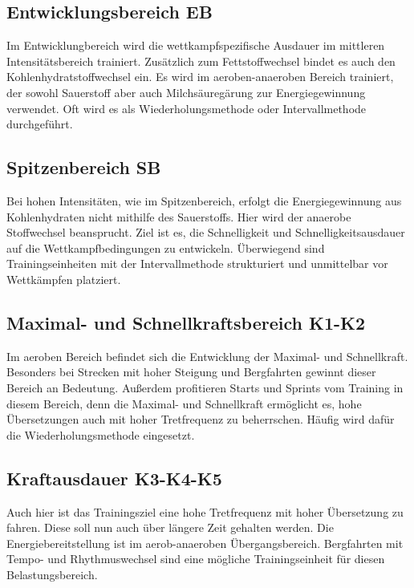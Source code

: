 \subsection{Entwicklungsbereich EB}
Im Entwicklungbereich wird die wettkampfspezifische Ausdauer im mittleren Intensitätsbereich trainiert. Zusätzlich zum Fettstoffwechsel bindet es auch den Kohlenhydratstoffwechsel ein. Es wird im aeroben-anaeroben Bereich trainiert, der sowohl Sauerstoff aber auch Milchsäuregärung zur Energiegewinnung verwendet. Oft wird es als Wiederholungsmethode oder Intervallmethode durchgeführt.
\subsection{Spitzenbereich SB}
Bei hohen Intensitäten, wie im Spitzenbereich, erfolgt die Energiegewinnung aus Kohlenhydraten nicht mithilfe des Sauerstoffs. Hier wird der anaerobe Stoffwechsel beansprucht.
Ziel ist es, die Schnelligkeit und Schnelligkeitsausdauer auf die Wettkampfbedingungen zu entwickeln. Überwiegend sind Trainingseinheiten mit der Intervallmethode strukturiert und unmittelbar vor Wettkämpfen platziert.
\subsection{Maximal- und Schnellkraftsbereich K1-K2}
Im aeroben Bereich befindet sich die Entwicklung der Maximal- und Schnellkraft. Besonders bei Strecken mit hoher Steigung und Bergfahrten gewinnt dieser Bereich an Bedeutung. Außerdem profitieren Starts und Sprints vom Training in diesem Bereich, denn die Maximal- und Schnellkraft ermöglicht es, hohe Übersetzungen auch mit hoher Tretfrequenz zu beherrschen. Häufig wird dafür die Wiederholungsmethode eingesetzt. 
\subsection{Kraftausdauer K3-K4-K5}
Auch hier ist das Trainingsziel eine hohe Tretfrequenz mit hoher Übersetzung zu fahren. Diese soll nun auch über längere Zeit gehalten werden. Die Energiebereitstellung ist im aerob-anaeroben Übergangsbereich. Bergfahrten mit Tempo- und Rhythmuswechsel sind eine mögliche Trainingseinheit für diesen Belastungsbereich. \par

